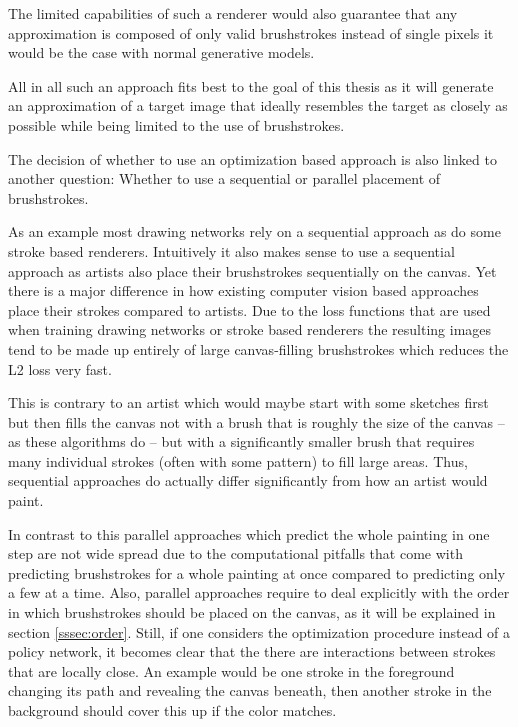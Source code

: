 The limited capabilities of such a renderer would also guarantee that any approximation is composed of only valid brushstrokes instead of single pixels it would be the case with normal generative models.

All in all such an approach fits best to the goal of this thesis as it will generate an approximation of a target image that ideally resembles the target as closely as possible while being limited to the use of brushstrokes.



The decision of whether to use an optimization based approach is also linked to another question: Whether to use a sequential or parallel placement of brushstrokes.

As an example most drawing networks rely on a sequential approach as do some stroke based renderers.
Intuitively it also makes sense to use a sequential approach as artists also place their brushstrokes sequentially on the canvas.
Yet there is a major difference in how existing computer vision based approaches place their strokes compared to artists.
Due to the loss functions that are used when training drawing networks or stroke based renderers the resulting images tend to be made up entirely of large canvas-filling brushstrokes which reduces the L2 loss very fast.

This is contrary to an artist which would maybe start with some sketches first but then fills the canvas not with a brush that is roughly the size of the canvas -- as these algorithms do -- but with a significantly smaller brush that requires many individual strokes (often with some pattern) to fill large areas.
Thus, sequential approaches do actually differ significantly from how an artist would paint.

In contrast to this parallel approaches which predict the whole painting in one step are not wide spread due to the computational pitfalls that come with predicting brushstrokes for a whole painting at once compared to predicting only a few at a time.
Also, parallel approaches require to deal explicitly with the order in which brushstrokes should be placed on the canvas, as it will be explained in section \ref{sssec:order}.
Still, if one considers the optimization procedure instead of a policy network, it becomes clear that the there are interactions between strokes that are locally close.
An example would be one stroke in the foreground changing its path and revealing the canvas beneath, then another stroke in the background should cover this up if the color matches.

